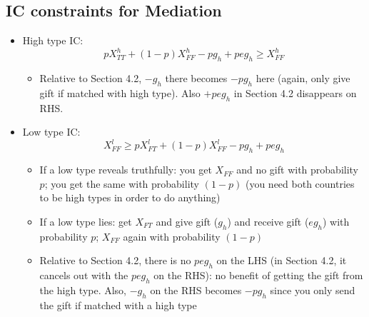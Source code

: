 \documentclass[12pt]{article}
\begin{document}
\subsection{IC constraints for Mediation}
\label{sec:const}
\begin{itemize}
	\item High type IC:
		$$pX_{TT}^h+(1-p)X_{FF}^h - pg_h +peg_h \geq X_{FF}^h $$
			\begin{itemize}
				\item Relative to Section 4.2, $-g_h$ there becomes $-pg_h$ here (again, only give gift if matched with high type). Also $+peg_h$ in Section 4.2 disappears on RHS.
			\end{itemize}
	\item Low type IC:
		$$X_{FF}^l \geq pX_{FT}^l+(1-p)X_{FF}^l-pg_h+peg_h $$
			\begin{itemize}
				\item If a low type reveals truthfully: you get $X_{FF}$ and no gift with probability $p$; you get the same with probability $(1-p)$ (you need both countries to be high types in order to do anything)
				\item If a low type lies: get $X_{FT}$ and give gift ($g_h$) and receive gift ($eg_h$) with probability $p$; $X_{FF}$ again with probability $(1-p)$
				\item Relative to Section 4.2, there is no $peg_h$ on the LHS (in Section 4.2, it cancels out with the $peg_h$ on the RHS): no benefit of getting the gift from the high type. Also, $-g_h$ on the RHS becomes $-pg_h$ since you only send the gift if matched with a high type
			\end{itemize}
\end{itemize}
\end{document}

